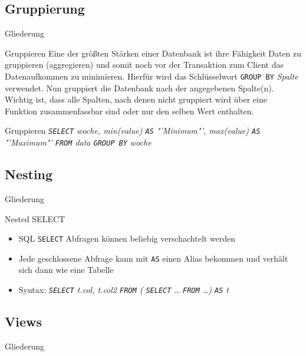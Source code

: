 \documentclass[18pt]{beamer}
\newcommand{\sql}[1]{%
\texttt{\color{sql}#1}
}
\begin{document}
\subsection{Gruppierung}

\begin{frame}{Gliederung}
\end{frame}

\begin{frame}{Gruppieren}
Eine der größten Stärken einer Datenbank ist ihre Fähigkeit Daten zu gruppieren (aggregieren) und somit noch vor der Transaktion zum Client das Datenaufkommen zu minimieren. Hierfür wird das Schlüsselwort \sql{GROUP BY} \textit{Spalte} verwendet. Nun gruppiert die Datenbank nach der angegebenen Spalte(n).\\
Wichtig ist, dass alle Spalten, nach denen nicht gruppiert wird über eine Funktion zusammenfassbar sind oder nur den selben Wert enthalten.
\end{frame}
\begin{frame}{Gruppieren}
\textit{\sql{SELECT} woche, min(value) \sql{AS} "'Minimum"', max(value) \sql{AS} "'Maximum"' \sql{FROM} data \sql{GROUP BY} woche}\bigskip\par
\end{frame}

\subsection{Nesting}
\begin{frame}{Gliederung}
\end{frame}

\begin{frame}{Nested SELECT}
\begin{itemize}
\item SQL \sql{SELECT} Abfragen können beliebig verschachtelt werden
\item Jede geschlossene Abfrage kann mit \sql{AS} einen Alias bekommen und verhält sich dann wie eine Tabelle
\bigskip\par
\item Syntax: \textit{\sql{SELECT} t.col, t.col2 \sql{FROM} (\sql{SELECT} \ldots \sql{FROM} \ldots) \sql{AS} t}
\end{itemize}
\end{frame}

\subsection{Views}
\begin{frame}{Gliederung}
\end{frame}
\end{document}
